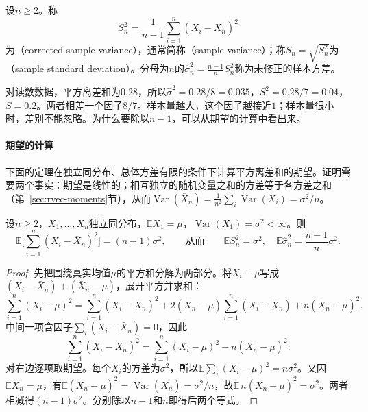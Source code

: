 \begin{definition}[样本方差]
\label{def:est-sample-variance}
设$n\ge2$。称
\begin{equation}
\label{eq:est-sample-variance}
S_n^2=\frac{1}{n-1}\sum_{i=1}^n(X_i-\bar X_n)^2
\end{equation}
为（corrected sample variance），通常简称（sample variance）；称$S_n=\sqrt{S_n^2}$为（sample standard deviation）。分母为$n$的$\hat\sigma_n^2=\frac{n-1}{n}S_n^2$称为未修正的样本方差。
\end{definition}

对读数数据，平方离差和为$0.28$，所以$\hat\sigma^2=0.28/8=0.035$，$S^2=0.28/7=0.04$，$S=0.2$。两者相差一个因子$8/7$。样本量越大，这个因子越接近$1$；样本量很小时，差别不能忽略。为什么要除以$n-1$，可以从期望的计算中看出来。

\paragraph{期望的计算}
下面的定理在独立同分布、总体方差有限的条件下计算平方离差和的期望。证明需要两个事实：期望是线性的；相互独立的随机变量之和的方差等于各方差之和（第~\ref{sec:rvec-moments}节），从而$\operatorname{Var}(\bar X_n)=\frac{1}{n^2}\sum_i\operatorname{Var}(X_i)=\sigma^2/n$。

\begin{theorem}[平方离差和的期望]
\label{thm:est-sample-variance-expectation}
设$n\ge2$，$X_1,\dots,X_n$独立同分布，$\mathbb{E}X_1=\mu$，$\operatorname{Var}(X_1)=\sigma^2<\infty$。则
\[
\mathbb{E}\Big[\sum_{i=1}^n(X_i-\bar X_n)^2\Big]=(n-1)\sigma^2,
\qquad\text{从而}\qquad
\mathbb{E}S_n^2=\sigma^2,\quad \mathbb{E}\hat\sigma_n^2=\frac{n-1}{n}\sigma^2 .
\]
\end{theorem}

\begin{proof}
先把围绕真实均值$\mu$的平方和分解为两部分。将$X_i-\mu$写成$(X_i-\bar X_n)+(\bar X_n-\mu)$，展开平方并求和：
\[
\sum_{i=1}^n(X_i-\mu)^2=\sum_{i=1}^n(X_i-\bar X_n)^2+2(\bar X_n-\mu)\sum_{i=1}^n(X_i-\bar X_n)+n(\bar X_n-\mu)^2 .
\]
中间一项含因子$\sum_i(X_i-\bar X_n)=0$，因此
\begin{equation}
\label{eq:est-sum-of-squares-decomposition}
\sum_{i=1}^n(X_i-\bar X_n)^2=\sum_{i=1}^n(X_i-\mu)^2-n(\bar X_n-\mu)^2 .
\end{equation}
对右边逐项取期望。每个$X_i$的方差为$\sigma^2$，所以$\mathbb{E}\sum_i(X_i-\mu)^2=n\sigma^2$。又因$\mathbb{E}\bar X_n=\mu$，有$\mathbb{E}(\bar X_n-\mu)^2=\operatorname{Var}(\bar X_n)=\sigma^2/n$，故$\mathbb{E}\,n(\bar X_n-\mu)^2=\sigma^2$。两者相减得$(n-1)\sigma^2$。分别除以$n-1$和$n$即得后两个等式。
\end{proof}

